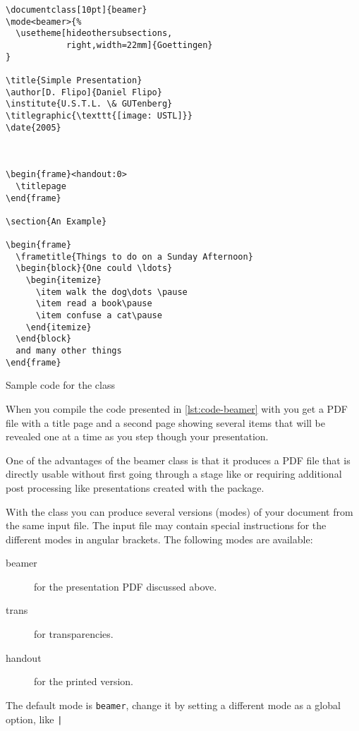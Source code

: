 \begin{listing}
  \begin{verbatim}
\documentclass[10pt]{beamer}
\mode<beamer>{%
  \usetheme[hideothersubsections,
            right,width=22mm]{Goettingen}
}

\title{Simple Presentation}
\author[D. Flipo]{Daniel Flipo}
\institute{U.S.T.L. \& GUTenberg}
\titlegraphic{\texttt{[image: USTL]}}
\date{2005}



\begin{frame}<handout:0>
  \titlepage
\end{frame}

\section{An Example}

\begin{frame}
  \frametitle{Things to do on a Sunday Afternoon}
  \begin{block}{One could \ldots}
    \begin{itemize}
      \item walk the dog\dots \pause
      \item read a book\pause
      \item confuse a cat\pause
    \end{itemize}
  \end{block}
  and many other things
\end{frame}

\end{verbatim}
  \caption{Sample code for the  class}%
  \label{lst:code-beamer}
\end{listing}

When you compile the code presented in \autoref{lst:code-beamer}
with  you get a PDF file with a title page and a second page
showing several items that will be revealed one at a time as you step
though your presentation.

One of the advantages of the beamer class is that it produces a PDF
file that is directly usable without first going through a \PSi{}
stage like  or requiring additional post processing like
presentations created with the  package.

With the  class you can produce several versions (modes) of your
document from the same input file. The input file may contain special
instructions for the different modes in angular brackets. The
following modes are available:
\begin{description}
  \item[beamer] for the presentation PDF
    discussed above.
  \item[trans] for transparencies.
  \item[handout] for the printed version.
\end{description}
The default mode is \texttt{beamer}, change it by setting a
different mode as a global option, like
\texttt|\documentclass[10pt,handout]{beamer}| to print the handouts for
example.

